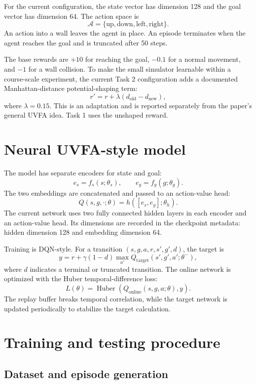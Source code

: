 \documentclass[11pt,a4paper]{article}
\begin{document}
For the current configuration, the state vector has dimension 128 and the goal
vector has dimension 64. The action space is
\[
\mathcal{A}=\{\text{up},\text{down},\text{left},\text{right}\}.
\]
An action into a wall leaves the agent in place. An episode terminates when the
agent reaches the goal and is truncated after 50 steps.

The base rewards are $+10$ for reaching the goal, $-0.1$ for a normal movement,
and $-1$ for a wall collision. To make the small simulator learnable within a
course-scale experiment, the current Task 2 configuration adds a documented
Manhattan-distance potential-shaping term:
\[
    r' = r + \lambda(d_{\text{old}}-d_{\text{new}}),
\]
where $\lambda=0.15$. This is an adaptation and is reported separately from
the paper's general UVFA idea. Task 1 uses the unshaped reward.

\section{Neural UVFA-style model}

The model has separate encoders for state and goal:
\[
    e_s=f_s(s;\theta_s), \qquad e_g=f_g(g;\theta_g).
\]
The two embeddings are concatenated and passed to an action-value head:
\[
    Q(s,g,\cdot;\theta)=h([e_s,e_g];\theta_h).
\]
The current network uses two fully connected hidden layers in each encoder and
an action-value head. Its dimensions are recorded in the checkpoint metadata:
hidden dimension 128 and embedding dimension 64.

Training is DQN-style. For a transition $(s,g,a,r,s',g',d)$, the target is
\[
    y=r+\gamma(1-d)\max_{a'}Q_{\mathrm{target}}(s',g',a';\theta^-),
\]
where $d$ indicates a terminal or truncated transition. The online network is
optimized with the Huber temporal-difference loss:
\[
    L(\theta)=\operatorname{Huber}
    \left(Q_{\mathrm{online}}(s,g,a;\theta),y\right).
\]
The replay buffer breaks temporal correlation, while the target network is
updated periodically to stabilize the target calculation.

\section{Training and testing procedure}

\subsection{Dataset and episode generation}
\end{document}
